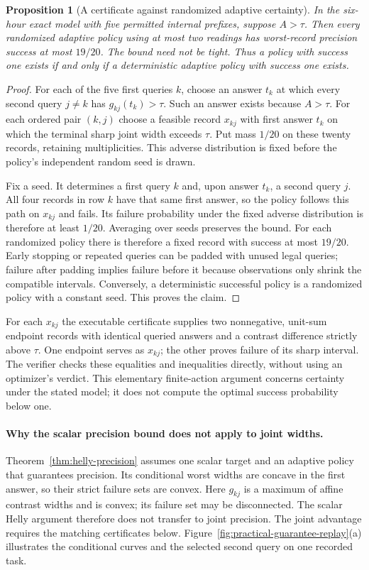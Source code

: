 \documentclass[12pt]{article}
\newtheorem{proposition}{Proposition}
\begin{document}
\begin{proposition}[A certificate against randomized adaptive certainty]
\label{prop:assurance-feasibility}
In the six-hour exact model with five permitted internal prefixes,
suppose $A>\tau$. Then every randomized
adaptive policy using at most two readings has worst-record precision
success at most $19/20$. The bound need not be tight. Thus a policy with
success one exists if and only if a deterministic adaptive policy with
success one exists.
\end{proposition}
\begin{proof}
For each of the five first queries $k$, choose an answer $t_k$ at which
every second query $j\ne k$ has $g_{kj}(t_k)>\tau$. Such an answer exists
because $A>\tau$. For each ordered pair $(k,j)$ choose a feasible record
$x_{kj}$ with first answer $t_k$ on which the terminal sharp joint width
exceeds $\tau$. Put mass $1/20$ on these twenty records, retaining
multiplicities. This adverse distribution is fixed before the policy's
independent random seed is drawn.

Fix a seed. It determines a first query $k$ and, upon answer $t_k$, a
second query $j$. All four records in row $k$ have that same first answer,
so the policy follows this path on $x_{kj}$ and fails. Its failure
probability under the fixed adverse distribution is therefore at least
$1/20$. Averaging over seeds preserves the bound. For each randomized
policy there is therefore a fixed record with success at most $19/20$.
Early stopping or repeated queries can be padded with unused legal queries;
failure after padding implies failure before it because observations only
shrink the compatible intervals. Conversely, a deterministic successful
policy is a randomized policy with a constant seed. This proves the claim.
\end{proof}

For each $x_{kj}$ the executable certificate supplies two nonnegative,
unit-sum endpoint records with identical queried answers and a contrast
difference strictly above $\tau$. One endpoint serves as $x_{kj}$; the
other proves failure of its sharp interval. The verifier checks these
equalities and inequalities directly, without using an optimizer's verdict.
This elementary finite-action argument concerns certainty under the stated
model; it does not compute the optimal success probability below one.
\paragraph{Why the scalar precision bound does not apply to joint widths.}
Theorem~\ref{thm:helly-precision} assumes one scalar target and an adaptive
policy that guarantees precision. Its conditional worst widths are concave
in the first answer, so their strict failure sets are convex. Here $g_{kj}$
is a maximum of affine contrast widths and is convex; its failure set may
be disconnected. The scalar Helly argument therefore does not transfer to
joint precision. The joint advantage requires the matching certificates
below. Figure~\ref{fig:practical-guarantee-replay}(a) illustrates the
conditional curves and the selected second query on one recorded task.
\end{document}
